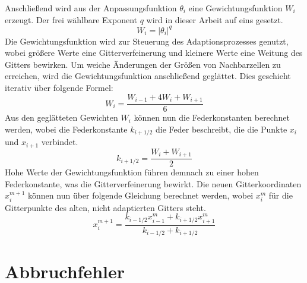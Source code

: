 Anschließend wird aus der Anpassungsfunktion $\theta_i$ eine Gewichtungsfunktion
$W_i$ erzeugt.
Der frei wählbare Exponent $q$ wird in dieser Arbeit auf eins gesetzt.
\begin{equation}
  W_i = \vert\theta_i \vert^q
\end{equation}
Die Gewichtungsfunktion wird zur Steuerung des Adaptionsprozesses genutzt, wobei größere
Werte eine Gitterverfeinerung und kleinere Werte eine Weitung des Gitters bewirken. Um
weiche Änderungen der Größen von Nachbarzellen zu erreichen, wird die Gewichtungsfunktion
anschließend geglättet. Dies geschieht iterativ über folgende Formel:
\begin{equation}
  W_i = \frac{W_{i-1} + 4W_i + W_{i+1}}{6}
\end{equation}
Aus den geglätteten Gewichten $W_i$ können nun die Federkonstanten berechnet werden, wobei
die Federkonstante $k_{i+1/2}$ die Feder beschreibt, die die Punkte $x_{i}$ und $x_{i+1}$ verbindet.
\begin{equation}
  k_{i+1/2} = \frac{W_i + W_{i+1}}{2}
\end{equation}
Hohe Werte der Gewichtungsfunktion führen demnach zu einer hohen Federkonstante, was die
Gitterverfeinerung bewirkt. Die neuen Gitterkoordinaten $x_i^{m+1}$ können nun über folgende
Gleichung berechnet werden, wobei $x_i^m$ für die Gitterpunkte des alten, nicht adaptierten
Gitters steht.
\begin{equation}
  x_i^{m+1} = \frac{k_{i-1/2} x_{i-1}^m + k_{i+1/2} x_{i+1}^m}{k_{i-1/2} + k_{i+1/2}}
\end{equation}


\section{Abbruchfehler}

